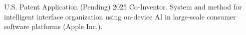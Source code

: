 \begin{cvskills}
\cvskill
    {U.S. Patent Application (Pending) 2025}
    {Co-Inventor. System and method for intelligent interface organization using on-device AI \newline in large-scale consumer software platforms (Apple Inc.).}
\end{cvskills}
